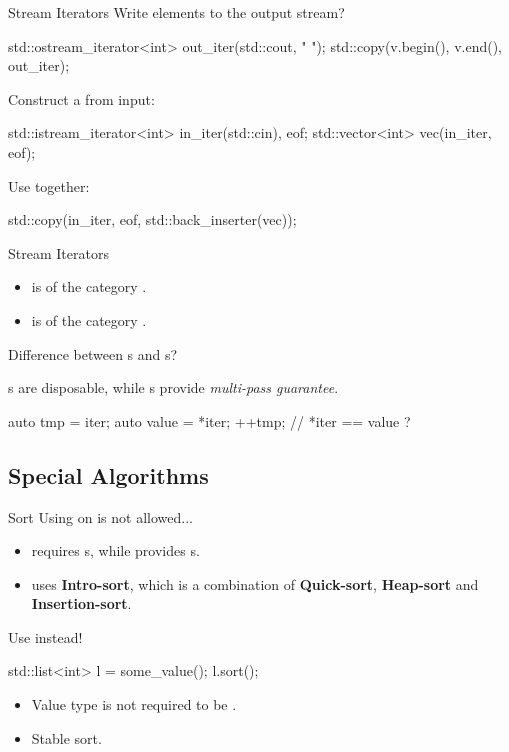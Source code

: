 \begin{frame}[fragile]{Stream Iterators}
    Write elements to the output stream?
    \begin{cpp}
std::ostream_iterator<int> out_iter(std::cout, " ");
std::copy(v.begin(), v.end(), out_iter);
    \end{cpp}
    \pause
    Construct a  from input:
    \begin{cpp}
std::istream_iterator<int> in_iter(std::cin), eof;
std::vector<int> vec(in_iter, eof);
    \end{cpp}
    Use  together:
    \begin{cpp}
std::copy(in_iter, eof, std::back_inserter(vec));
    \end{cpp}
\end{frame}

\begin{frame}[fragile]{Stream Iterators}
    \begin{itemize}
        \item {} is of the category .
        \item {} is of the category .
    \end{itemize}
    Difference between s and s?\par
    \pause
    s are disposable, while s provide \textit{multi-pass guarantee}.
    \begin{cpp}
auto tmp = iter;
auto value = *iter;
++tmp;
// *iter == value ?
    \end{cpp}
\end{frame}

\subsection{Special Algorithms}

\begin{frame}[fragile]{Sort}
    Using  on  is not allowed...
    \begin{itemize}
        \item {} requires s, while  provides s.
        \item {} uses \textbf{Intro-sort}, which is a combination of \textbf{Quick-sort}, \textbf{Heap-sort} and \textbf{Insertion-sort}.
    \end{itemize}
    \pause
    Use  instead!
    \begin{cpp}
std::list<int> l = some_value();
l.sort();
    \end{cpp}
    \begin{itemize}
        \item Value type is not required to be .
        \item Stable sort.
    \end{itemize}
\end{frame}

